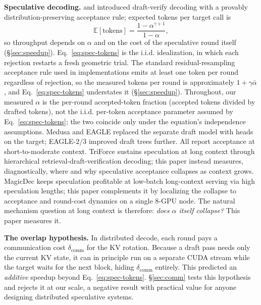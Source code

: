 \documentclass{article}
\begin{document}
\textbf{Speculative decoding.} \citet{leviathan2023fast} and
\citet{chen2023accelerating} introduced draft-verify decoding with
a provably distribution-preserving acceptance rule; expected
tokens per target call is
\begin{equation}
\label{eq:spec-tokens}
\mathbb{E}[\text{tokens}] = \frac{1 - \alpha^{\gamma+1}}{1 - \alpha},
\end{equation}
so throughput depends on $\alpha$ and on the cost of the
speculative round itself (\S\ref{sec:speedup}).
Eq.~\ref{eq:spec-tokens} is the i.i.d. idealization, in which
each rejection restarts a fresh geometric trial. The standard
residual-resampling acceptance rule used in implementations emits
at least one token per round regardless of rejection, so the
measured tokens per round is approximately $1 + \gamma \bar\alpha$,
and Eq.~\ref{eq:spec-tokens} understates it (\S\ref{sec:speedup}).
Throughout, our measured $\alpha$ is the per-round
accepted-token fraction (accepted tokens divided by drafted
tokens), not the i.i.d. per-token acceptance parameter assumed by
Eq.~\ref{eq:spec-tokens}; the two coincide only under the
equation's independence assumptions.
Medusa \citep{cai2024medusa} and EAGLE
\citep{li2024eagle} replaced the separate draft model with heads
on the target; EAGLE-2/3 improved draft trees further. All report
acceptance at short-to-moderate context. TriForce
\citep{sun2024triforce} sustains speculation at long context
through hierarchical retrieval-draft-verification decoding; this
paper instead measures, diagnostically, where and why speculative
acceptance collapses as context grows. MagicDec
\citep{chen2024magicdec} keeps speculation profitable at low-batch
long-context serving via high speculation lengths; this paper
complements it by localizing the collapse to acceptance and
round-cost dynamics on a single 8-GPU node. The natural mechanism
question at long context is therefore: \emph{does $\alpha$ itself
collapse?} This paper measures it.

\textbf{The overlap hypothesis.} In distributed decode, each
round pays a communication cost $\delta_{\text{comm}}$ for the KV
rotation. Because a draft pass needs only the current KV state, it
can in principle run on a separate CUDA stream while the target
waits for the next block, hiding $\delta_{\text{comm}}$ entirely.
This predicted an \emph{additive} speedup beyond
Eq.~\ref{eq:spec-tokens}. \S\ref{sec:comm} tests this hypothesis
and rejects it at our scale, a negative result with practical
value for anyone designing distributed speculative systems.
\end{document}
